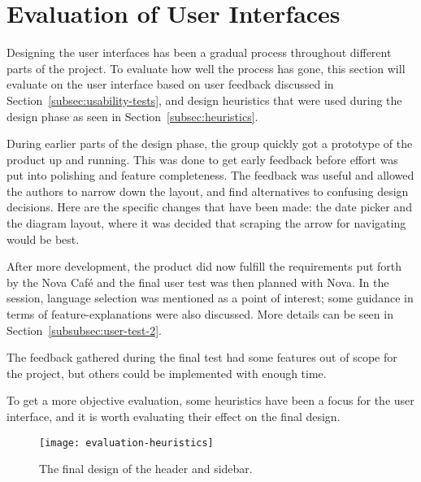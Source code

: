 
\section{Evaluation of User Interfaces}\label{sec:evaluation}
Designing the user interfaces has been a gradual process throughout different
parts of the project.
To evaluate how well the process has gone, this section will evaluate on the
user interface based on user feedback discussed in Section~\ref{subsec:usability-tests},
and design heuristics that were used during the design phase as seen in Section~\ref{subsec:heuristics}.

During earlier parts of the design phase, the group quickly got a prototype of
the product up and running.
This was done to get early feedback before effort was put into polishing and
feature completeness.
The feedback was useful and allowed the authors to narrow down the layout,
and find alternatives to confusing design decisions.
Here are the specific changes that have been made: the date picker and the
diagram layout, where it was decided that scraping the arrow for navigating
would be best.

After more development, the product did now fulfill the requirements put forth
by the Nova Café and the final user test was then planned with Nova.
In the session, language selection was mentioned as a point of interest; some
guidance in terms of feature-explanations were also discussed.
More details can be seen in Section~\ref{subsubsec:user-test-2}.

The feedback gathered during the final test had some features out of
scope for the project, but others could be implemented with enough time.

To get a more objective evaluation, some heuristics have been a focus for
the user interface, and it is worth evaluating their effect on the final design.

\begin{figure}
    \centering
    \texttt{[image: evaluation-heuristics]}
    \caption{The final design of the header and sidebar.
    }\label{fig:evaluation-heuristics}
\end{figure}


